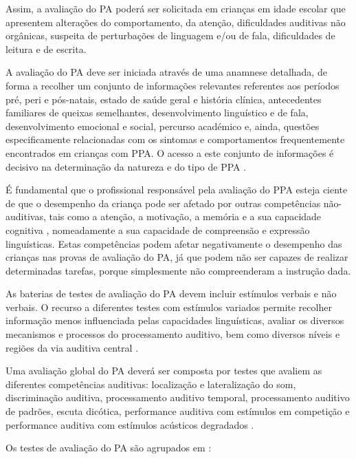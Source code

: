 \documentclass[output=paper,colorlinks,citecolor=brown,booklanguage=portuguese]{langscibook}
\begin{document}
Assim, a avaliação do PA poderá ser solicitada em crianças em idade escolar que apresentem alterações do comportamento, da atenção, dificuldades auditivas não orgânicas, suspeita de perturbações de linguagem e/ou de fala, dificuldades de leitura e de escrita.

A avaliação do PA deve ser iniciada através de uma anamnese detalhada, de forma a recolher um conjunto de informações relevantes referentes aos períodos pré, peri e pós-natais, estado de saúde geral e história clínica, antecedentes familiares de queixas semelhantes, desenvolvimento linguístico e de fala, desenvolvimento emocional e social, percurso académico e, ainda, questões especificamente relacionadas com os sintomas e comportamentos frequentemente encontrados em crianças com PPA. O acesso a este conjunto de informações é decisivo na determinação da natureza e do tipo de PPA \citep{ASHA2005}. 

É fundamental que o profissional responsável pela avaliação do PPA esteja ciente de que o desempenho da criança pode ser afetado por outras competências não-auditivas, tais como a atenção, a motivação, a memória e a sua capacidade cognitiva \citep{Koravand2017}, nomeadamente a sua capacidade de compreensão e expressão linguísticas. Estas competências podem afetar negativamente o desempenho das crianças nas provas de avaliação do PA, já que podem não ser capazes de realizar determinadas tarefas, porque simplesmente não compreenderam a instrução dada.  

As baterias de testes de avaliação do PA devem incluir estímulos verbais e não verbais. O recurso a diferentes testes com estímulos variados permite recolher informação menos influenciada pelas capacidades linguísticas, avaliar os diversos mecanismos e processos do processamento auditivo, bem como diversos níveis e regiões da via auditiva central \citep{Moore2011, ASHA2005}.

Uma avaliação global do PA deverá ser composta por testes que avaliem as diferentes competências auditivas: localização e lateralização do som, discriminação auditiva, processamento auditivo temporal, processamento auditivo de padrões, escuta dicótica, performance auditiva com estímulos em competição e performance auditiva com estímulos acústicos degradados \citep{AAA2010, CISG2012}.

Os testes de avaliação do PA são agrupados em \citep{Bellis1999, AAA2010, ASHA2005, Keith2019}:
\end{document}
